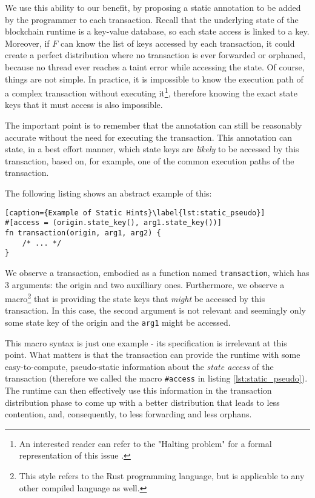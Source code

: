 We use this ability to our benefit, by proposing a static annotation to be added by the programmer
to each transaction. Recall that the underlying state of the blockchain runtime is a key-value
database, so each state access is linked to a key. Moreover, if $F$ can know the list of keys
accessed by each transaction, it could create a perfect distribution where no transaction is ever
forwarded or orphaned, because no thread ever reaches a taint error while accessing the state. Of
course, things are not simple. In practice, it is impossible to know the execution path of a complex
transaction without executing it\footnote{An interested reader can refer to the "Halting problem"
for a formal representation of this issue \cite{burkholderHaltingProblem1987}.}, therefore knowing
the exact state keys that it must access is also impossible.

The important point is to remember that the annotation can still be reasonably accurate without the
need for executing the transaction. This annotation can state, in a best effort manner, which state
keys are \textit{likely} to be accessed by this transaction, based on, for example, one of the
common execution paths of the transaction.

The following listing shows an abstract example of this:

\begin{lstlisting}[caption={Example of Static Hints}\label{lst:static_pseudo}]
#[access = (origin.state_key(), arg1.state_key())]
fn transaction(origin, arg1, arg2) {
	/* ... */
}
\end{lstlisting}

We observe a transaction, embodied as a function named \texttt{transaction}, which has 3 arguments:
the origin and two auxilliary ones. Furthermore, we observe a macro\footnote{This style refers to the
Rust programming language, but is applicable to any other compiled language as well.} that is
providing the state keys that \textit{might} be accessed by this transaction. In this case, the
second argument is not relevant and seemingly only some state key of the origin and the
\texttt{arg1} might be accessed.

This macro syntax is just one example - its specification is irrelevant at this point. What matters is that the transaction can provide the runtime with some easy-to-compute, pseudo-static
information about the \textit{state access} of the transaction (therefore we called the macro
\texttt{\#access} in listing \ref{lst:static_pseudo}). The runtime can then effectively use this
information in the transaction distribution phase to come up with a better distribution that leads
to less contention, and, consequently, to less forwarding and less orphans.


